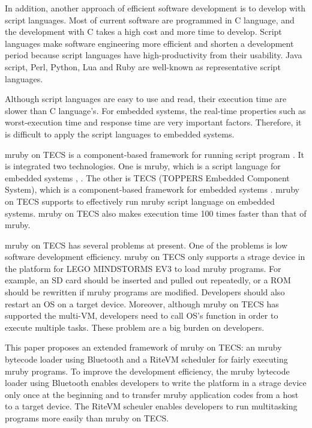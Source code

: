 \documentclass[conference,compsoc]{IEEEtran}
\begin{document}
In addition, another approach of efficient software development is to develop with script languages.
Most of current software are programmed in C language, and the development with C takes a high cost and more time to develop.
Script languages make software engineering more efficient and shorten a development period because script languages have high-productivity from their usability.
Java script, Perl, Python, Lua and Ruby are well-known as representative script languages.

Although script languages are easy to use and read, their execution time are slower than C language's.
For embedded systems, the real-time properties such as worst-execution time and response time are very important factors.
Therefore, it is difficult to apply the script languages to embedded systems.

mruby on TECS is a component-based framework for running script program \cite{par:mrubyonTECS}.
It is integrated two technologies.
One is mruby, which is a script language for embedded systems \cite{par:mruby}, \cite{url:mruby}.
The other is TECS (TOPPERS Embedded Component System), which is a component-based framework for embedded systems \cite{par:TECS} \cite{url:TOPPERS}.
mruby on TECS supports to effectively run mruby script language on embedded systems.
mruby on TECS also makes execution time 100 times faster than that of mruby.

mruby on TECS has several problems at present.
One of the problems is low software development efficiency.
mruby on TECS only supports a strage device in the platform for LEGO MINDSTORMS EV3 \cite{par:EV3} to load mruby programs.
For example, an SD card should be inserted and pulled out repeatedly, or a ROM should be rewritten if mruby programs are modified.
Developers should also restart an OS on a target device.
Moreover, although mruby on TECS has supported the multi-VM, developers need to call OS's function in order to execute multiple tasks.
These problem are a big burden on developers.

This paper proposes an extended framework of mruby on TECS: an mruby bytecode loader using Bluetooth and a RiteVM scheduler for fairly executing mruby programs.
To improve the development efficiency, the mruby bytecode loader using Bluetooth enables developers to write the platform in a strage device only once at the beginning and to transfer mruby application codes from a host to a target device.
The RiteVM scheuler enables developers to run multitasking programs more easily than mruby on TECS.
\end{document}
